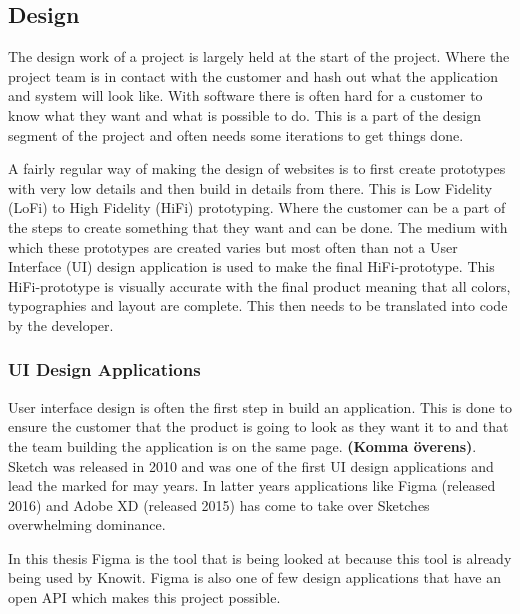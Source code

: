 

\subsection{Design}%
\label{sub:Design}
The design work of a project is largely held at the start of the project. Where the project team is in contact with the customer and hash out what the application and system will look like. With software there is often hard for a customer to know what they want and what is possible to do. This is a part of the design segment of the project and often needs some iterations to get things done. 

A fairly regular way of making the design of websites is to first create prototypes with very low details and then build in details from there. This is Low Fidelity (LoFi) to High Fidelity (HiFi) prototyping. Where the customer can be a part of the steps to create something that they want and can be done. The medium with which these prototypes are created varies but most often than not a User Interface (UI) design application is used to make the final HiFi-prototype. This HiFi-prototype is visually accurate with the final product meaning that all colors, typographies and layout are complete. This then needs to be translated into code by the developer.

\subsubsection{UI Design Applications}%
\label{ssub:Apps}
User interface design is often the first step in build an application. This is done to ensure the customer that the product is going to look as they want it to and that the team building the application is on the same page. \textbf{(Komma överens)}.  Sketch \cite{sketchDigitalDesignToolkit} was released in 2010 and was one of the first UI design applications and lead the marked for may years. In latter years applications like Figma \cite{figmaFigmaCollaborativeInterface} (released 2016) and Adobe XD \cite{adobeAdobeXDFast}(released 2015) has come to take over Sketches overwhelming dominance. 

In this thesis Figma is the tool that is being looked at because this tool is already being used by Knowit. Figma is also one of few design applications that have an open API which makes this project possible. 

